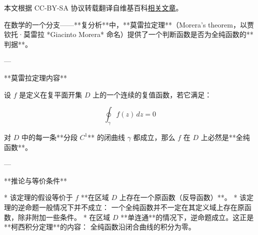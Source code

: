 
本文根据 CC-BY-SA 协议转载翻译自维基百科\href{https://en.wikipedia.org/wiki/Morera\%27s_theorem}{相关文章}。

在数学的一个分支——**复分析**中，**莫雷拉定理**（Morera's theorem，以贾钦托·莫雷拉 *Giacinto Morera* 命名）提供了一个判断函数是否为全纯函数的**判据**。

---

**莫雷拉定理内容**

设 $f$ 是定义在复平面开集 $D$ 上的一个连续的复值函数，若它满足：

$$
\oint_{\gamma} f(z)\,dz = 0
$$

对 $D$ 中的每一条**分段 $C^1$** 的闭曲线 $\gamma$ 都成立，那么 $f$ 在 $D$ 上必然是**全纯函数**。

---

**推论与等价条件**

* 该定理的假设等价于 $f$ **在区域 $D$ 上存在一个原函数（反导函数）**。
* 该定理的逆命题一般情况下并不成立：
  一个全纯函数并不一定在其定义域上存在原函数，除非附加一些条件。
* 在区域 $D$ **单连通**的情况下，逆命题成立。这正是**柯西积分定理**的内容：
  全纯函数沿闭合曲线的积分为零。
